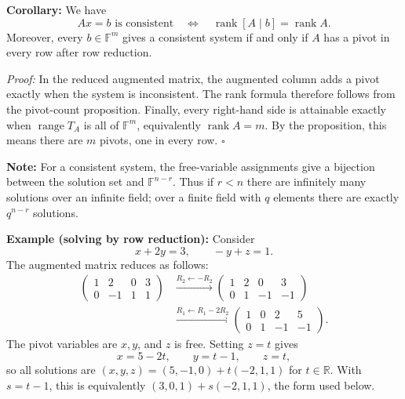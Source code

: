 \documentclass[a4paper,11pt,abstract=true]{scrartcl}
\theoremstyle{dotlessP}
\theoremstyle{dotlessS}
\theoremstyle{remark}
\theoremstyle{definition}
\begin{document}
\begin{claim_box}
\textbf{Corollary:} We have
\[
Ax=b\text{ is consistent}
\quad\Longleftrightarrow\quad
\operatorname{rank}[A\mid b]=\operatorname{rank}A.
\]
Moreover, every $b\in\mathbb{F}^m$ gives a consistent system if and
only if $A$ has a pivot in every row after row reduction.

\textit{Proof:} In the reduced augmented matrix, the augmented column
adds a pivot exactly when the system is inconsistent. The rank formula
therefore follows from the pivot-count proposition. Finally, every
right-hand side is attainable exactly when $\operatorname{range}T_A$
is all of $\mathbb{F}^m$, equivalently $\operatorname{rank}A=m$.
By the proposition, this means there are $m$ pivots, one in every row.
\hfill$\square$
\end{claim_box}

\begin{remark_box}
\textbf{Note:} For a consistent system,
the free-variable assignments give a bijection between the solution
set and $\mathbb{F}^{n-r}$. Thus if $r<n$ there are infinitely many
solutions over an infinite field; over a finite field with $q$ elements
there are exactly $q^{n-r}$ solutions.
\end{remark_box}

\begin{example_box}
\textbf{Example (solving by row reduction):} Consider
\[
x+2y=3,\qquad -y+z=1.
\]
The augmented matrix reduces as follows:
\[
\begin{aligned}
\left(\begin{array}{ccc|c}1&2&0&3\\0&-1&1&1\end{array}\right)
&\xrightarrow{R_2\leftarrow -R_2}
\left(\begin{array}{ccc|c}1&2&0&3\\0&1&-1&-1\end{array}\right)\\[4pt]
&\xrightarrow{R_1\leftarrow R_1-2R_2}
\left(\begin{array}{ccc|c}1&0&2&5\\0&1&-1&-1\end{array}\right).
\end{aligned}
\]
The pivot variables are $x,y$, and $z$ is free. Setting $z=t$ gives
\[
x=5-2t,\qquad y=t-1,\qquad z=t,
\]
so all solutions are
$(x,y,z)=(5,-1,0)+t(-2,1,1)$ for $t\in\mathbb{R}$.
With $s=t-1$, this is equivalently
$(3,0,1)+s(-2,1,1)$, the form used below.
\end{example_box}
\end{document}
